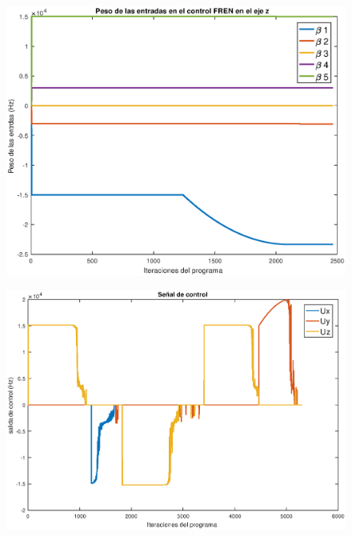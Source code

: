 \begin{figure}
	\centering
	\includegraphics[width=1\linewidth]{visio/graficasderesultados/betasz1}
	\caption{}
	\label{fig:betasz1}
\end{figure}
\begin{figure}
	\centering
	\includegraphics[width=1\linewidth]{visio/graficasderesultados/control1}
	\caption{}
	\label{fig:control1}
\end{figure}
